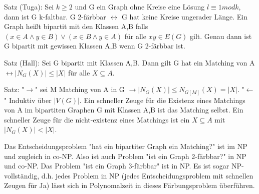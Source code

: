 \documentclass[a4paper]{article}
\begin{document}
\begin{multicols}{3}
    Satz (Tuga): Sei $k\geq 2$ und G ein Graph ohne Kreise eine Lösung $l\equiv 1 mod k$, dann ist G k-faltbar. G 2-färbbar $\leftrightarrow$ G hat keine Kreise ungerader Länge. Ein Graph heißt bipartit mit den Klassen A,B falls $(x\in A \wedge y\in B)\vee (x\in B \wedge y\in A)$ für alle $xy \in E(G)$ gilt. Genau dann ist G bipartit mit gewissen Klassen A,B wenn G 2-färbbar ist.
    
    Satz (Hall): Sei G bipartit mit Klassen A,B. Dann gilt G hat ein Matching von A $\leftrightarrow |N_G(X)|\leq |X|$ für alle $X\subseteq A$.
    
    Satz: "$\rightarrow$" sei M Matching von A in G $\rightarrow |N_G(X)| \leq N_{G[M]}(X)=|X|$. "$\leftarrow$" Induktiv über $|V(G)|$.
    Ein schneller Zeuge für die Existenz eines Matchings von A im bipartiten Graphen G mit Klassen A,B ist das Matching selbst. Ein schneller Zeuge für die nicht-existenz eines Matchings ist ein $X\subseteq A$ mit $|N_G(X)| < |X|$.
    
    Das Entscheidungsproblem "hat ein bipartiter Graph ein Matching?" ist im NP und zugleich in co-NP. Also ist auch Problem "ist ein Graph 2-färbbar?" in NP und co-NP. Das Problem "ist ein Graph 3-färbbar" ist in NP. Es ist sogar NP-vollständig, d.h. jedes Problem in NP (jedes Entscheidungsproblem mit schnellen Zeugen für Ja) lässt sich in Polynomalzeit in dieses Färbungsproblem überführen.
    
\end{multicols}
\end{document}
